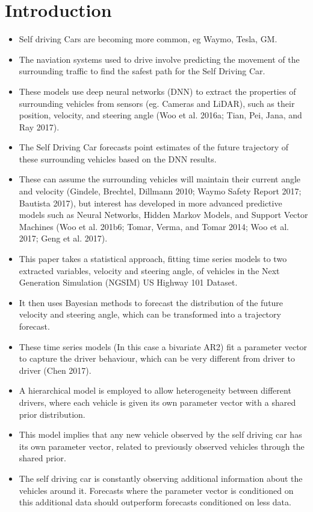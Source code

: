 \documentclass[12pt,a4paper]{article}\usepackage[]{graphicx}\usepackage[]{color}
\begin{document}
\section{Introduction}

\begin{itemize}
\item Self driving Cars are becoming more common, eg Waymo, Tesla, GM.
\item The naviation systems used to drive involve predicting the movement of the surrounding traffic to find the safest path for the Self Driving Car.
\item These models use deep neural networks (DNN) to extract the properties of surrounding vehicles from sensors (eg. Cameras and LiDAR), such as their position, velocity, and steering angle (Woo et al. 2016a; Tian, Pei, Jana, and Ray 2017).
\item The Self Driving Car forecasts point estimates of the future trajectory of these surrounding vehicles based on the DNN results.
\item These can assume the surrounding vehicles will maintain their current angle and velocity (Gindele, Brechtel, Dillmann 2010; Waymo Safety Report 2017; Bautista 2017), but interest has developed in more advanced predictive models such as Neural Networks, Hidden Markov Models, and Support Vector Machines (Woo et al. 201b6; Tomar, Verma, and Tomar 2014; Woo et al. 2017; Geng et al. 2017).
\item This paper takes a statistical approach, fitting time series models to two extracted variables, velocity and steering angle, of vehicles in the Next Generation Simulation (NGSIM) US Highway 101 Dataset.
\item It then uses Bayesian methods to forecast the distribution of the future velocity and steering angle, which can be transformed into a trajectory forecast.
\item These time series models (In this case a bivariate AR2) fit a parameter vector to capture the driver behaviour, which can be very different from driver to driver (Chen 2017).
\item A hierarchical model is employed to allow heterogeneity between different drivers, where each vehicle is given its own parameter vector with a shared prior distribution.
\item This model implies that any new vehicle observed by the self driving car has its own parameter vector, related to previously observed vehicles through the shared prior.
\item The self driving car is constantly observing additional information about the vehicles around it. Forecasts where the parameter vector is conditioned on this additional data should outperform forecasts conditioned on less data.

\end{itemize}
\end{document}
